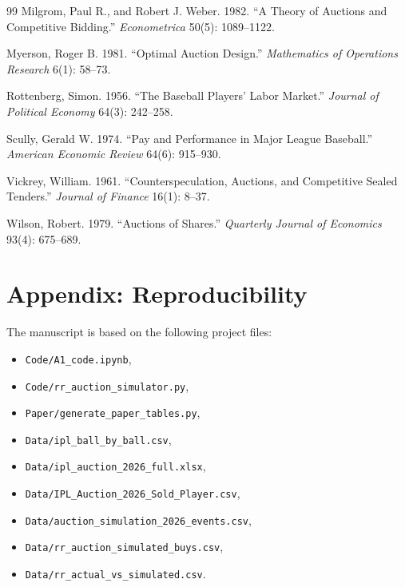 \documentclass[11pt]{article}
\begin{document}
\begin{thebibliography}{99}
Milgrom, Paul R., and Robert J. Weber. 1982.
``A Theory of Auctions and Competitive Bidding.''
\textit{Econometrica} 50(5): 1089--1122.

Myerson, Roger B. 1981.
``Optimal Auction Design.''
\textit{Mathematics of Operations Research} 6(1): 58--73.

Rottenberg, Simon. 1956.
``The Baseball Players' Labor Market.''
\textit{Journal of Political Economy} 64(3): 242--258.

Scully, Gerald W. 1974.
``Pay and Performance in Major League Baseball.''
\textit{American Economic Review} 64(6): 915--930.

Vickrey, William. 1961.
``Counterspeculation, Auctions, and Competitive Sealed Tenders.''
\textit{Journal of Finance} 16(1): 8--37.

Wilson, Robert. 1979.
``Auctions of Shares.''
\textit{Quarterly Journal of Economics} 93(4): 675--689.

\end{thebibliography}

\appendix

\section*{Appendix: Reproducibility}

The manuscript is based on the following project files:
\begin{itemize}[leftmargin=1.5em]
    \item \texttt{Code/A1\_code.ipynb},
    \item \texttt{Code/rr\_auction\_simulator.py},
    \item \texttt{Paper/generate\_paper\_tables.py},
    \item \texttt{Data/ipl\_ball\_by\_ball.csv},
    \item \texttt{Data/ipl\_auction\_2026\_full.xlsx},
    \item \texttt{Data/IPL\_Auction\_2026\_Sold\_Player.csv},
    \item \texttt{Data/auction\_simulation\_2026\_events.csv},
    \item \texttt{Data/rr\_auction\_simulated\_buys.csv},
    \item \texttt{Data/rr\_actual\_vs\_simulated.csv}.
\end{itemize}
\end{document}
